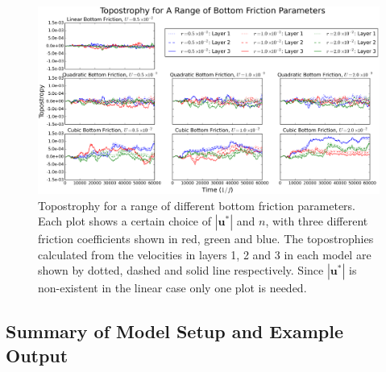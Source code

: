 \documentclass[12pt,a4paper]{report}
\begin{document}
  
  \begin{figure}
  	\centering
  	\includegraphics[width=\linewidth]{topostrophy}
  	\caption{Topostrophy for a range of different bottom friction parameters.
  		Each plot shows a certain choice of  $\left|\boldsymbol{u}^{\ast}\right|$
  		and $n$, with three different friction coefficients shown in red, green and blue.
  		The topostrophies calculated from the velocities in layers 1, 2 and 3 in each model
  		are shown by dotted, dashed and solid line respectively. Since 
  		$\left|\boldsymbol{u}^{\ast}\right|$ is non-existent in the linear case only
  		one plot is needed. }
  	\label{fig:topostrophy}
  \end{figure}
  
  
  \subsection{Summary of Model Setup and Example Output}
  
\end{document}
